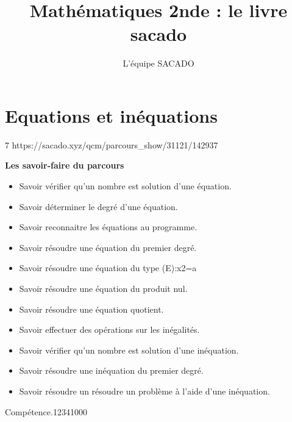



\title{Mathématiques 2nde  : le livre sacado}
\author{L'équipe SACADO}




\chapter{Equations et inéquations}{7}
{https://sacado.xyz/qcm/parcours_show/31121/142937}
{
 \begin{CpsCol}
	\textbf{Les savoir-faire du parcours}
 	\begin{itemize}
 		\item Savoir vérifier qu'un nombre est solution d'une équation.
		\item Savoir déterminer le degré d'une équation.
		\item Savoir reconnaitre les équations au programme.
		\item Savoir résoudre une équation du premier degré.
		\item Savoir résoudre une équation du type (E):x2=a
		\item Savoir résoudre une équation du produit nul.
		\item Savoir résoudre une équation quotient. 
		\item Savoir effectuer des opérations sur les inégalités.
		\item Savoir vérifier qu'un nombre est solution d'une inéquation.
		\item Savoir résoudre une inéquation du premier degré.
		\item Savoir résoudre un résoudre un problème à l'aide d'une inéquation.
 	\end{itemize}
 \end{CpsCol}

\begin{His}
\end{His}

\begin{ExoDec}{Compétence.}{1234}{1}{0}{0}{0}
\end{ExoDec}
}

